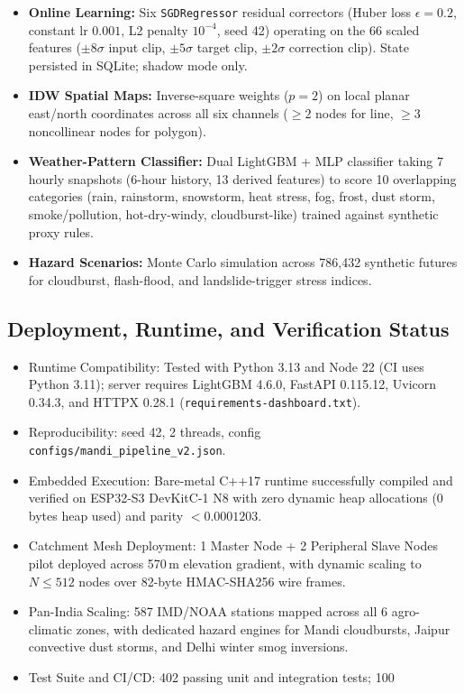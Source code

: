 \documentclass[journal,a4paper]{IEEEtran}
\begin{document}
\begin{itemize}
  \item \textbf{Online Learning:} Six \texttt{SGDRegressor} residual correctors (Huber loss $\epsilon=0.2$, constant lr $0.001$, L2 penalty $10^{-4}$, seed 42) operating on the 66 scaled features ($\pm 8\sigma$ input clip, $\pm 5\sigma$ target clip, $\pm 2\sigma$ correction clip). State persisted in SQLite; shadow mode only.
  \item \textbf{IDW Spatial Maps:} Inverse-square weights ($p=2$) on local planar east/north coordinates across all six channels ($\ge 2$ nodes for line, $\ge 3$ noncollinear nodes for polygon).
  \item \textbf{Weather-Pattern Classifier:} Dual LightGBM + MLP classifier taking 7 hourly snapshots (6-hour history, 13 derived features) to score 10 overlapping categories (rain, rainstorm, snowstorm, heat stress, fog, frost, dust storm, smoke/pollution, hot-dry-windy, cloudburst-like) trained against synthetic proxy rules.
  \item \textbf{Hazard Scenarios:} Monte Carlo simulation across 786{,}432 synthetic futures for cloudburst, flash-flood, and landslide-trigger stress indices.
\end{itemize}

\subsection{Deployment, Runtime, and Verification Status}

\begin{itemize}
  \item Runtime Compatibility: Tested with Python 3.13 and Node 22 (CI uses Python 3.11); server requires LightGBM 4.6.0, FastAPI 0.115.12, Uvicorn 0.34.3, and HTTPX 0.28.1 (\nolinkurl{requirements-dashboard.txt}).
  \item Reproducibility: seed 42, 2 threads, config \nolinkurl{configs/mandi_pipeline_v2.json}.
  \item Embedded Execution: Bare-metal C++17 runtime successfully compiled and verified on ESP32-S3 DevKitC-1 N8 with zero dynamic heap allocations (0 bytes heap used) and parity $< 0.0001203$.
  \item Catchment Mesh Deployment: 1 Master Node + 2 Peripheral Slave Nodes pilot deployed across 570\,m elevation gradient, with dynamic scaling to $N \le 512$ nodes over 82-byte HMAC-SHA256 wire frames.
  \item Pan-India Scaling: 587 IMD/NOAA stations mapped across all 6 agro-climatic zones, with dedicated hazard engines for Mandi cloudbursts, Jaipur convective dust storms, and Delhi winter smog inversions.
  \item Test Suite and CI/CD: 402 passing unit and integration tests; 100%
\end{itemize}
\end{document}
